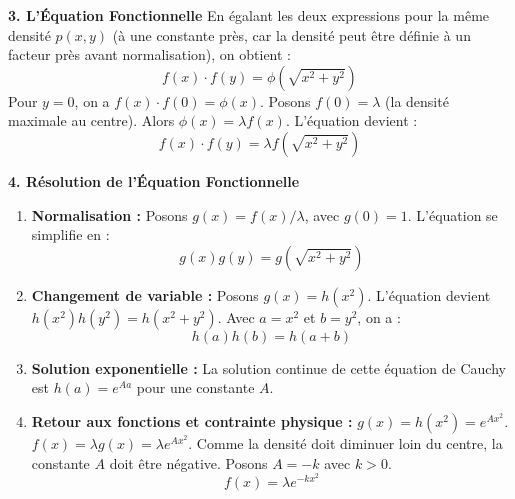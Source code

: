 \begin{proofbox}
\textbf{3. L'Équation Fonctionnelle}
\newline
En égalant les deux expressions pour la même densité $p(x, y)$ (à une constante près, car la densité peut être définie à un facteur près avant normalisation), on obtient :
$$ f(x) \cdot f(y) = \phi(\sqrt{x^2 + y^2}) $$
Pour $y=0$, on a $f(x) \cdot f(0) = \phi(x)$. Posons $f(0) = \lambda$ (la densité maximale au centre). Alors $\phi(x) = \lambda f(x)$.
L'équation devient :
$$ f(x) \cdot f(y) = \lambda f(\sqrt{x^2 + y^2}) $$

\textbf{4. Résolution de l'Équation Fonctionnelle}
\begin{enumerate}
    \item \textbf{Normalisation :} Posons $g(x) = f(x)/\lambda$, avec $g(0)=1$. L'équation se simplifie en :
    $$ g(x) g(y) = g(\sqrt{x^2 + y^2}) $$
    \item \textbf{Changement de variable :} Posons $g(x) = h(x^2)$. L'équation devient $h(x^2)h(y^2) = h(x^2+y^2)$. Avec $a=x^2$ et $b=y^2$, on a :
    $$ h(a) h(b) = h(a+b) $$
    \item \textbf{Solution exponentielle :} La solution continue de cette équation de Cauchy est $h(a) = e^{Aa}$ pour une constante $A$.
    \item \textbf{Retour aux fonctions et contrainte physique :}
    $g(x) = h(x^2) = e^{Ax^2}$.
    $f(x) = \lambda g(x) = \lambda e^{Ax^2}$.
    Comme la densité doit diminuer loin du centre, la constante $A$ doit être négative. Posons $A = -k$ avec $k>0$.
    $$ f(x) = \lambda e^{-k x^2} $$
\end{enumerate}


\end{proofbox}
